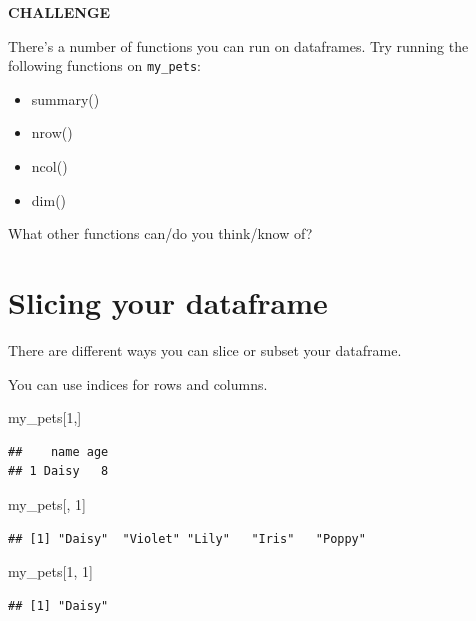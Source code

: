 \documentclass[
]{book}
\newenvironment{Shaded}{\begin{snugshade}}{\end{snugshade}}
\newcommand{\DecValTok}[1]{\textcolor[rgb]{0.00,0.00,0.81}{#1}}
\newcommand{\NormalTok}[1]{#1}
\begin{document}
\textbf{CHALLENGE}

There's a number of functions you can run on dataframes. Try running the following functions on \texttt{my\_pets}:

\begin{itemize}
\item
  summary()
\item
  nrow()
\item
  ncol()
\item
  dim()
\end{itemize}

What other functions can/do you think/know of?

\hypertarget{slicing-your-dataframe}{%
\section{Slicing your dataframe}\label{slicing-your-dataframe}}

There are different ways you can slice or subset your dataframe.

You can use indices for rows and columns.

\begin{Shaded}
\begin{Highlighting}[]
\NormalTok{my_pets[}\DecValTok{1}\NormalTok{,]}
\end{Highlighting}
\end{Shaded}

\begin{verbatim}
##    name age
## 1 Daisy   8
\end{verbatim}

\begin{Shaded}
\begin{Highlighting}[]
\NormalTok{my_pets[, }\DecValTok{1}\NormalTok{]}
\end{Highlighting}
\end{Shaded}

\begin{verbatim}
## [1] "Daisy"  "Violet" "Lily"   "Iris"   "Poppy"
\end{verbatim}

\begin{Shaded}
\begin{Highlighting}[]
\NormalTok{my_pets[}\DecValTok{1}\NormalTok{, }\DecValTok{1}\NormalTok{]}
\end{Highlighting}
\end{Shaded}

\begin{verbatim}
## [1] "Daisy"
\end{verbatim}
\end{document}
